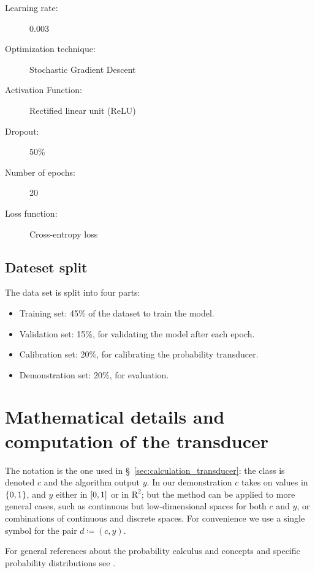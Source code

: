 \documentclass[a4paper,12pt,%
onecolumn,oneside,article,%
british%
]{memoir}
\newcommand*{\RR}{\bm{\mathrm{R}}}
\newcommand*{\defd}{\coloneqq}
\DeclarePairedDelimiter\clcl{[}{]}
\DeclarePairedDelimiter\set{\{}{\}} %
\renewcommand*{\|}[1][]{\nonscript\:#1\vert\nonscript\:\mathopen{}}
\newcommand*{\sect}{\S}%
\begin{document}
\begin{framed}
  \begin{description}
  \item[Learning rate:] 0.003 
  \item[Optimization technique:] Stochastic Gradient Descent 
  \item[Activation Function:] Rectified linear unit (ReLU) 
  \item[Dropout:] 50\% 
  \item[Number of epochs:] 20 
  \item[Loss function:] Cross-entropy loss
  \end{description}
\end{framed}

\subsection{Dateset split}

The data set is split into four parts:
\begin{itemize}
\item Training set: 45\% of the dataset to train the model.
\item Validation set: 15\%, for validating the model after each epoch.
\item Calibration set: 20\%, for calibrating the probability transducer.
\item Demonstration set: 20\%, for evaluation.
\end{itemize}

\bigskip

\section{Mathematical details and computation of the transducer}
\label{sec:maths_transducer}

The notation is the one used in \sect~\ref{sec:calculation_transducer}: the class is denoted $c$ and the algorithm output $y$. In our demonstration $c$ takes on values in $\set{0,1}$, and $y$ either in $\clcl{0,1}$ or in $\RR^{2}$; but the method can be applied to more general cases, such as continuous but low-dimensional spaces for both $c$ and $y$, or combinations of continuous and discrete spaces. For convenience we use a single symbol for the pair $d \defd (c, y)$.

For general references about the probability calculus and concepts and specific probability distributions see \cites{jaynes1994_r2003,mackay1995_r2005,jeffreys1939_r1983,gregory2005,bernardoetal1994_r2000,hailperin1996,good1950,fentonetal2019,johnsonetal1969_r1996,johnsonetal1969b_r2005,johnsonetal1970_r1994,johnsonetal1970b_r1995,kotzetal1972_r2000}.
\end{document}
